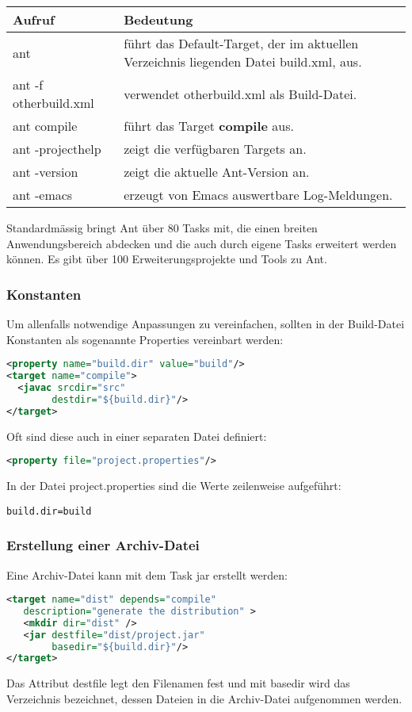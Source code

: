 \begin{tabularx}{\linewidth}{l|X}
Aufruf   & Bedeutung \\
\hline
ant  &  führt das Default-Target, der im aktuellen
  Verzeichnis liegenden Datei build.xml, aus.\\
ant -f otherbuild.xml & verwendet otherbuild.xml als
  Build-Datei. \\
ant compile & führt das Target {\bfseries compile}
  aus.\\
ant -projecthelp & zeigt die verfügbaren Targets an.\\
ant -version & zeigt die aktuelle Ant-Version an.\\
ant -emacs & erzeugt von Emacs auswertbare Log-Meldungen.\\
\end{tabularx}

Standardmässig bringt Ant über 80 Tasks mit, die einen breiten
Anwendungsbereich abdecken und die auch durch eigene Tasks erweitert werden
können. Es gibt über 100 Erweiterungsprojekte und Tools zu Ant.
%
\newslide
\subsubsection{Konstanten}
Um allenfalls notwendige Anpassungen zu vereinfachen, sollten in der
Build-Datei Konstanten als sogenannte Properties vereinbart werden:
\begin{lstlisting}[language=xml, morekeywords={property,target,javac}]
<property name="build.dir" value="build"/>
<target name="compile">
  <javac srcdir="src"
        destdir="${build.dir}"/>
</target>
\end{lstlisting}
Oft sind diese auch in einer separaten Datei definiert:
\begin{lstlisting}[language=xml,morekeywords={property}]
<property file="project.properties"/>
\end{lstlisting}
In der Datei project.properties sind die Werte zeilenweise aufgeführt:
\begin{verbatim}
build.dir=build
\end{verbatim}
%
\newslide
\subsubsection{Erstellung einer Archiv-Datei}
Eine Archiv-Datei kann mit dem Task jar erstellt werden:
\begin{lstlisting}[language=xml,morekeywords={target,jar,mkdir}]
<target name="dist" depends="compile"
   description="generate the distribution" >
   <mkdir dir="dist" />
   <jar destfile="dist/project.jar"
        basedir="${build.dir}"/>
</target>
\end{lstlisting}
Das Attribut destfile legt den Filenamen fest und mit basedir wird
das Verzeichnis bezeichnet, dessen Dateien in die Archiv-Datei
aufgenommen werden.

